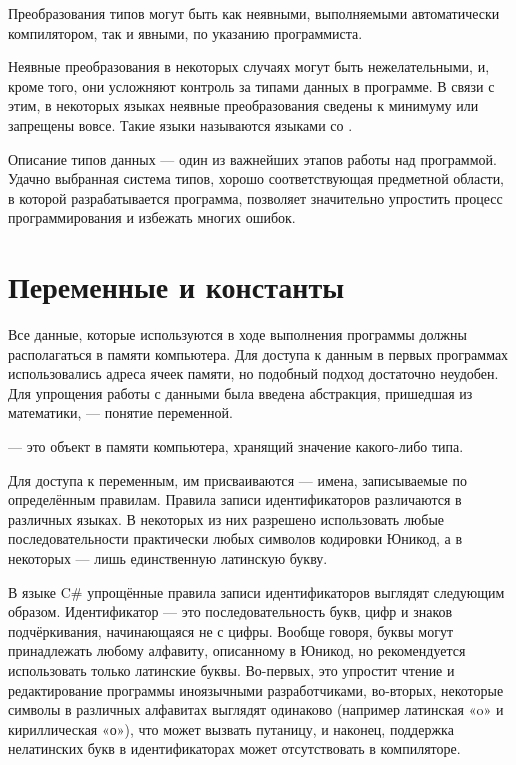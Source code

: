Преобразования типов могут быть как неявными, выполняемыми
автоматически компилятором, так и явными, по указанию программиста.

Неявные преобразования в некоторых случаях могут быть нежелательными,
и, кроме того, они усложняют контроль за типами данных в программе.  В
связи с этим, в некоторых языках неявные преобразования сведены к
минимуму или запрещены вовсе. Такие языки называются языками со
.

Описание типов данных — один из важнейших этапов работы над
программой.  Удачно выбранная система типов, хорошо соответствующая
предметной области, в которой разрабатывается программа, позволяет
значительно упростить процесс программирования и избежать многих
ошибок.

\section{Переменные и константы}


Все данные, которые используются в ходе выполнения программы должны
располагаться в памяти компьютера. Для доступа к данным в первых
программах использовались адреса ячеек памяти, но подобный подход
достаточно неудобен. Для упрощения работы с данными была введена
абстракция, пришедшая из математики, — понятие переменной.

\begin{defn}
   — это объект в памяти компьютера,
  хранящий значение какого-либо типа.
\end{defn}


Для доступа к переменным, им присваиваются
 — имена, записываемые по
определённым правилам. Правила записи идентификаторов различаются в
различных языках. В некоторых из них разрешено использовать любые
последовательности практически любых символов кодировки Юникод, а в
некоторых — лишь единственную латинскую букву.

В языке C\# упрощённые правила записи идентификаторов выглядят
следующим образом. Идентификатор — это последовательность букв, цифр и
знаков подчёркивания, начинающаяся не с цифры. Вообще говоря, буквы
могут принадлежать любому алфавиту, описанному в Юникод, но
рекомендуется использовать только латинские буквы. Во-первых, это
упростит чтение и редактирование программы иноязычными разработчиками,
во-вторых, некоторые символы в различных алфавитах выглядят одинаково
(например латинская «o» и кириллическая «о»), что может вызвать
путаницу, и наконец, поддержка нелатинских букв в идентификаторах
может отсутствовать в компиляторе.

